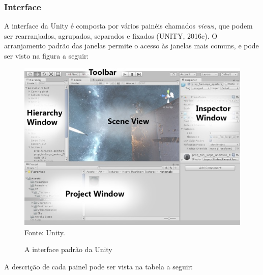 \documentclass[12pt,a4paper]{article}
\newcommand{\source}[1]{\small Fonte: {#1}}
\begin{document}
		\FloatBarrier
		\subsubsection{Interface}
			A interface da Unity é composta por vários painéis chamados \textit{views},
			que podem ser rearranjados, agrupados, separados e fixados
			(UNITY, 2016c).
			O arranjamento padrão das janelas permite o acesso às janelas mais comuns,
			e pode ser visto na figura a seguir:
			
			\begin{figure}[ht!]
				\label{interfaceUnity}
				\caption{A interface padrão da Unity}
				\centering
				\includegraphics[scale=0.5]{InterfaceUnity.jpg}\\
				\vspace{0.5mm}
				\source{Unity.}
			\end{figure}	
			
			A descrição de cada painel pode ser vista na tabela a seguir:
			
\end{document}

